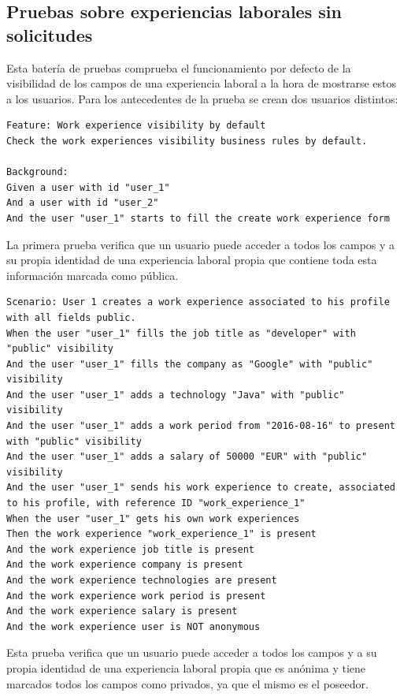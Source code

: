 \documentclass[a4paper, 12pt]{book}
\begin{document}
    \subsection{Pruebas sobre experiencias laborales sin solicitudes}
    Esta batería de pruebas comprueba el funcionamiento por defecto de la visibilidad de los campos de una experiencia laboral
    a la hora de mostrarse estos a los usuarios.
    Para los antecedentes de la prueba se crean dos usuarios distintos:
        {\scriptsize
    \linespread{1}
    \begin{verbatim}
Feature: Work experience visibility by default
Check the work experiences visibility business rules by default.

Background:
Given a user with id "user_1"
And a user with id "user_2"
And the user "user_1" starts to fill the create work experience form
    \end{verbatim}
    }
    La primera prueba verifica que un usuario puede acceder a todos los campos y a su propia identidad de una experiencia
    laboral propia que contiene toda esta información marcada como pública.
        {\scriptsize
    \linespread{1}
    \begin{verbatim}
Scenario: User 1 creates a work experience associated to his profile with all fields public.
When the user "user_1" fills the job title as "developer" with "public" visibility
And the user "user_1" fills the company as "Google" with "public" visibility
And the user "user_1" adds a technology "Java" with "public" visibility
And the user "user_1" adds a work period from "2016-08-16" to present with "public" visibility
And the user "user_1" adds a salary of 50000 "EUR" with "public" visibility
And the user "user_1" sends his work experience to create, associated to his profile, with reference ID "work_experience_1"
When the user "user_1" gets his own work experiences
Then the work experience "work_experience_1" is present
And the work experience job title is present
And the work experience company is present
And the work experience technologies are present
And the work experience work period is present
And the work experience salary is present
And the work experience user is NOT anonymous
    \end{verbatim}
    }
    Esta prueba verifica que un usuario puede acceder a todos los campos y a su propia identidad de una experiencia
    laboral propia que es anónima y tiene marcados todos los campos como privados, ya que el mismo es el poseedor.
\end{document}

